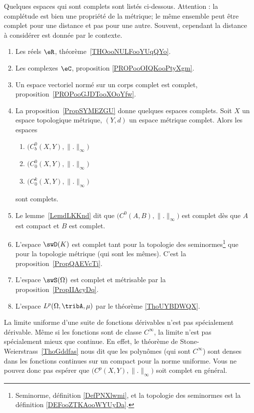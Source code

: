 Quelques espaces qui sont complets sont listés ci-dessous. Attention : la complétude est bien une propriété de la métrique; le même ensemble peut être complet pour une distance et pas pour une autre. Souvent, cependant la distance à considérer est donnée par  le contexte.
\begin{multicols}{2}
	\begin{enumerate}
		\item
		      Les réels \( \eR\), théorème~\ref{THOooNULFooYUqQYo}.
		\item
		      Les complexes \( \eC\), proposition \ref{PROPooOIQKooPtyXgm}.
		\item
		      Un espace vectoriel normé sur un corps complet est complet, proposition~\ref{PROPooGJDTooXOoYfw}.
		\item
		      La proposition~\ref{PropSYMEZGU} donne quelques espaces complets. Soit \( X\) un espace topologique métrique, \( (Y,d)\) un espace métrique complet. Alors les espaces
		      \begin{enumerate}
			      \item
			            \( \big( C^0_b(X,Y),\| . \|_{\infty} \big)\)
			      \item
			            \( \big( C^0_0(X,Y),\| . \|_{\infty} \big)\)
			      \item
			            \( \big( C^k_0(X,Y),\| . \|_{\infty} \big)\)
		      \end{enumerate}
		      sont complets.
		\item
		      Le lemme~\ref{LemdLKKnd} dit que \( \big( C^0(A,B),\| . \|_{\infty}\big)\) est complet dès que \( A\) est compact et \( B\) est complet.

		\item
		      L'espace \( \swD(K)\) est complet tant pour la topologie des seminormes\footnote{Seminorme, définition \ref{DefPNXlwmi}, et la topologie des seminormes est la définition \ref{DEFooZTKAooWYUyDa}.} que pour la topologie métrique (qui sont les mêmes). C'est la proposition~\ref{PropQAEVcTi}.
		\item
		      L'espace \( \swS(\Omega)\) est complet et métrisable par la proposition~\ref{PropIIAcyDq}.
		\item
		      L'espace \( L^p(\Omega,\tribA,\mu)\) par le théorème \ref{ThoUYBDWQX}.
	\end{enumerate}
\end{multicols}

La limite uniforme d'une suite de fonctions dérivables n'est pas spécialement dérivable. Même si les fonctions sont de classe \(  C^{\infty}\), la limite n'est pas spécialement mieux que continue. En effet, le théorème de Stone-Weierstrass~\ref{ThoGddfas} nous dit que les polynômes (qui sont \(  C^{\infty}\)) sont denses dans les fonctions continues sur un compact pour la norme uniforme. Vous ne pouvez donc pas espérer que \( \big( C^p(X,Y),\| . \|_{\infty} \big)\) soit complet en général.
